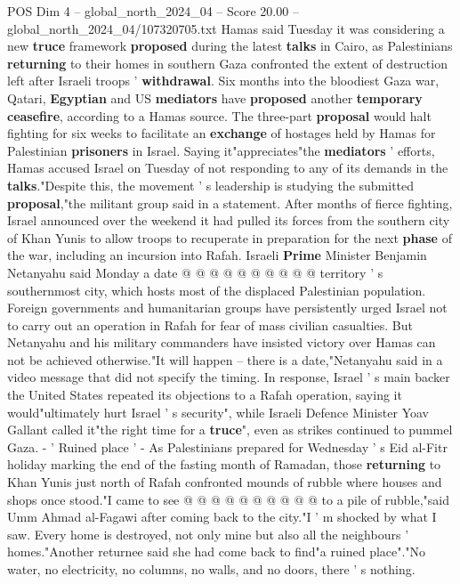 \begin{textsample}{POS Dim 4 – global\_north\_2024\_04 – Score 20.00 – global\_north\_2024\_04/107320705.txt}  \label{ex:f4_pos_363}
Hamas said Tuesday it was considering a new \textbf{truce} framework \textbf{proposed} during the latest \textbf{talks} in Cairo, as Palestinians \textbf{returning} to their homes in southern Gaza confronted the extent of destruction left after Israeli troops ' \textbf{withdrawal}.
Six months into the bloodiest Gaza war, Qatari, \textbf{Egyptian} and US \textbf{mediators} have \textbf{proposed} another \textbf{temporary} \textbf{ceasefire}, according to a Hamas source.
The three-part \textbf{proposal} would halt fighting for six weeks to facilitate an \textbf{exchange} of hostages held by Hamas for Palestinian \textbf{prisoners} in Israel.
Saying it"appreciates"the \textbf{mediators} ' efforts, Hamas accused Israel on Tuesday of not responding to any of its demands in the \textbf{talks}."Despite this, the movement ' s leadership is studying the submitted \textbf{proposal},"the militant group said in a statement.
After months of fierce fighting, Israel announced over the weekend it had pulled its forces from the southern city of Khan Yunis to allow troops to recuperate in preparation for the next \textbf{phase} of the war, including an incursion into Rafah.
Israeli \textbf{Prime} Minister Benjamin Netanyahu said Monday a date @ @ @ @ @ @ @ @ @ @ territory ' s southernmost city, which hosts most of the displaced Palestinian population.
Foreign governments and humanitarian groups have persistently urged Israel not to carry out an operation in Rafah for fear of mass civilian casualties.
But Netanyahu and his military commanders have insisted victory over Hamas can not be achieved otherwise."It will happen -- there is a date,"Netanyahu said in a video message that did not specify the timing.
In response, Israel ' s main backer the United States repeated its objections to a Rafah operation, saying it would"ultimately hurt Israel ' s security", while Israeli Defence Minister Yoav Gallant called it"the right time for a \textbf{truce}", even as strikes continued to pummel Gaza. - ' Ruined place ' - As Palestinians prepared for Wednesday ' s Eid al-Fitr holiday marking the end of the fasting month of Ramadan, those \textbf{returning} to Khan Yunis just north of Rafah confronted mounds of rubble where houses and shops once stood."I came to see @ @ @ @ @ @ @ @ @ @ to a pile of rubble,"said Umm Ahmad al-Fagawi after coming back to the city."I ' m shocked by what I saw.
Every home is destroyed, not only mine but also all the neighbours ' homes."Another returnee said she had come back to find"a ruined place"."No water, no electricity, no columns, no walls, and no doors, there ' s nothing.

\end{textsample}
